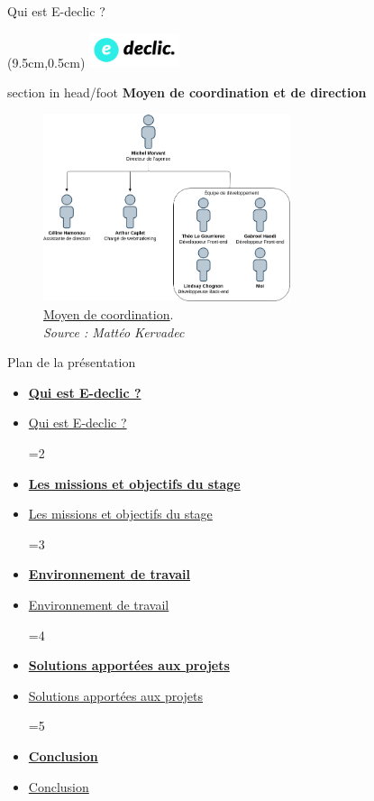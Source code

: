 \documentclass{beamer}
\newcommand{\logoEdeclic}{
	\begin{textblock*}{2cm}(9.5cm,0.5cm)
  		\includegraphics[height=1cm]{../img/logo_e-declic.png}
	\end{textblock*}
}
\newcommand{\planLine}[4]{
  \ifnum#1=#2
    \item \hyperlink{#3}{\textbf{\large #4}}
  \else
    \item \hyperlink{#3}{#4}
  \fi
}
\newcommand{\planSlide}[1]{
  	\begin{frame}{Plan de la présentation}
  		\begin{center}
  			\begin{minipage}{1\textwidth}
				\begin{itemize}
      			\planLine{#1}{1}{organisation}{Qui est E-declic ?}
      			\planLine{#1}{2}{sujet}{Les missions et objectifs du stage}
      			\planLine{#1}{3}{environnement}{Environnement de travail}
      			\planLine{#1}{4}{realisation}{Solutions apportées aux projets}
      			\planLine{#1}{5}{conclusion}{Conclusion}
	    		\end{itemize}
  		\end{minipage}
	\end{center}
	\vfill
	\end{frame}
}
\begin{document}
\begin{frame}{Qui est E-declic ?}
	\logoEdeclic
	
	\begin{beamercolorbox}[wd=\paperwidth,ht=1.5em,dp=0.5em,leftskip=0.5cm]{section in head/foot}
  		\large \textbf{Moyen de coordination et de direction}
	\end{beamercolorbox}
	\vspace{0.5em}
	\begin{center}
  		\begin{minipage}{0.9\textwidth}
			\begin{figure}[t]
  				\includegraphics[height=5.5cm]{../img/coordination.png}
  				\caption{
    					\href{https://www.e-declic.com/agence-web/equipe/}{\underline{Moyen de coordination}}.\\
    					\textit{Source : Mattéo Kervadec}
  				}
  				\label{fig:coordination}
  			\end{figure}
  		\end{minipage}
	\end{center}
	\vfill
\end{frame}

\planSlide{2}
\end{document}
